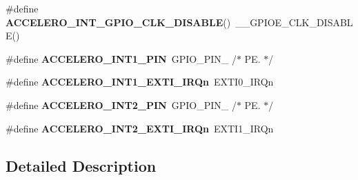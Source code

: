 \begin{DoxyCompactItemize}
\#define {\bfseries A\+C\+C\+E\+L\+E\+R\+O\+\_\+\+I\+N\+T\+\_\+\+G\+P\+I\+O\+\_\+\+C\+L\+K\+\_\+\+D\+I\+S\+A\+B\+LE}()~\+\_\+\+\_\+\+G\+P\+I\+O\+E\+\_\+\+C\+L\+K\+\_\+\+D\+I\+S\+A\+B\+LE()
\item 
\mbox{\label{group___s_t_m32_f4___d_i_s_c_o_v_e_r_y___l_o_w___l_e_v_e_l___b_u_s_ga28d34166ded3cde3bacbafb5710c6043}} 
\#define {\bfseries A\+C\+C\+E\+L\+E\+R\+O\+\_\+\+I\+N\+T1\+\_\+\+P\+IN}~G\+P\+I\+O\+\_\+\+P\+I\+N\+\_                 /$\ast$ P\+E. $\ast$/
\item 
\mbox{\label{group___s_t_m32_f4___d_i_s_c_o_v_e_r_y___l_o_w___l_e_v_e_l___b_u_s_ga9a4635d8168b412ef9a8a89dcdb549dd}} 
\#define {\bfseries A\+C\+C\+E\+L\+E\+R\+O\+\_\+\+I\+N\+T1\+\_\+\+E\+X\+T\+I\+\_\+\+I\+R\+Qn}~E\+X\+T\+I0\+\_\+\+I\+R\+Qn
\item 
\mbox{\label{group___s_t_m32_f4___d_i_s_c_o_v_e_r_y___l_o_w___l_e_v_e_l___b_u_s_ga1e8392e4b8c426942f3bedb276a42146}} 
\#define {\bfseries A\+C\+C\+E\+L\+E\+R\+O\+\_\+\+I\+N\+T2\+\_\+\+P\+IN}~G\+P\+I\+O\+\_\+\+P\+I\+N\+\_                 /$\ast$ P\+E. $\ast$/
\item 
\mbox{\label{group___s_t_m32_f4___d_i_s_c_o_v_e_r_y___l_o_w___l_e_v_e_l___b_u_s_gabb1c76bce0baba6c9621b1e8339ce242}} 
\#define {\bfseries A\+C\+C\+E\+L\+E\+R\+O\+\_\+\+I\+N\+T2\+\_\+\+E\+X\+T\+I\+\_\+\+I\+R\+Qn}~E\+X\+T\+I1\+\_\+\+I\+R\+Qn
\end{DoxyCompactItemize}


\subsection{Detailed Description}
